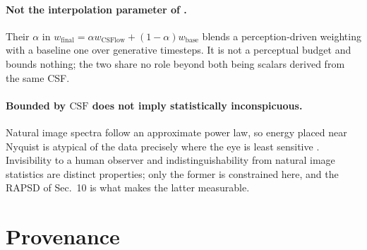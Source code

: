 \documentclass[11pt,a4paper]{article}
\begin{document}
\paragraph{Not the interpolation parameter of \citet{galinska2026csflow}.}
Their $\alpha$ in $w_{\mathrm{final}}=\alpha w_{\mathrm{CSFlow}}
+(1-\alpha)w_{\mathrm{base}}$ blends a perception-driven weighting with a
baseline one over generative timesteps. It is not a perceptual budget
and bounds nothing; the two share no role beyond both being scalars
derived from the same CSF.

\paragraph{Bounded by $\mathrm{CSF}$ does not imply statistically
inconspicuous.}
Natural image spectra follow an approximate power law, so energy placed
near Nyquist is atypical of the data precisely where the eye is least
sensitive \citep{falck2025fourier,dieleman2024spectral}. Invisibility to
a human observer and indistinguishability from natural image statistics
are distinct properties; only the former is constrained here, and the
RAPSD of Sec.~10 is what makes the latter measurable.

\section{Provenance}
\end{document}
